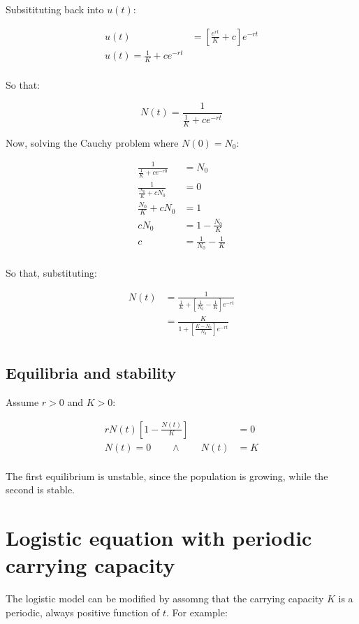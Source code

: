   Subsitituting back into $u(t)$:

  \begin{align*}
    u(t) &= \left[\frac{e^{rt}}{K} + c\right]e^{-rt}\\
    u(t) = \frac{1}{K} + ce^{-rt}\\
  \end{align*}

  So that:

  $$N(t) = \frac{1}{\frac{1}{K} + ce^{-rt}}$$

  Now, solving the Cauchy problem where $N(0) = N_0$:

  \begin{align*}
    \frac{1}{\frac{1}{K} + ce^{-r0}} &= N_0\\
    \frac{1}{\frac{N_0}{K} + cN_0} &= 0\\
    \frac{N_0}{K} + cN_0 &= 1\\
    cN_0 &= 1 - \frac{N_0}{K}\\
    c &= \frac{1}{N_0} - \frac{1}{K}\\
  \end{align*}

  So that, substituting:

  \begin{align*}
    N(t) &= \frac{1}{\frac{1}{K} + \left[\frac{1}{N_0} -\frac{1}{K}\right]e^{-rt}}\\
         &= \frac{K}{1 + \left[\frac{K-N_0}{N_0}\right]e^{-rt}}\\
  \end{align*}

  \subsection{Equilibria and stability}
  Assume $r>0$ and $K>0$:

  \begin{align*}
    rN(t)\left[1-\frac{N(t)}{K}\right] &= 0\\
    N(t) = 0\qquad\land\qquad N(t) &= K\\
  \end{align*}

  The first equilibrium is unstable, since the population is growing, while the second is stable.


\section{Logistic equation with periodic carrying capacity}
The logistic model can be modified by assomng that the carrying capacity $K$ is a periodic, always positive function of $t$.
For example:

